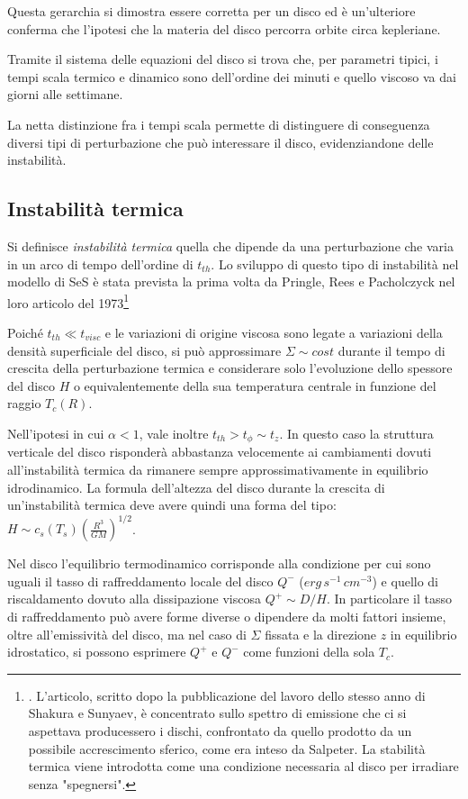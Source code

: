 \documentclass[a4paperbi]{article}
\begin{document}
	Questa gerarchia si dimostra essere corretta per un disco ed è un'ulteriore conferma che l'ipotesi che la materia del disco percorra orbite circa kepleriane.

	Tramite il sistema delle equazioni del disco si trova che, per parametri tipici, i tempi scala termico e dinamico sono dell'ordine dei minuti e quello viscoso va dai giorni alle settimane.

	La netta distinzione fra i tempi scala permette di distinguere di conseguenza diversi tipi di perturbazione che può interessare il disco, evidenziandone delle instabilità.
	
\subsection{Instabilità termica}
	
	Si definisce \textit{instabilità termica} quella che dipende da una perturbazione che varia in un arco di tempo dell'ordine di $t_{th}$. Lo sviluppo di questo tipo di instabilità nel modello di SeS è stata prevista la prima volta da Pringle, Rees e Pacholczyck nel loro articolo del 1973\footnote{\cite{PringleReesPacholczyk1973}. L'articolo, scritto dopo la pubblicazione del lavoro dello stesso anno di Shakura e Sunyaev, è concentrato sullo spettro di emissione che ci si aspettava producessero i dischi, confrontato da quello prodotto da un possibile accrescimento sferico, come era inteso da Salpeter. La stabilità termica viene introdotta come una condizione necessaria al disco per irradiare senza "spegnersi".}

	Poiché $t_{th}\ll t_{visc}$ e le variazioni di origine viscosa sono legate a variazioni della densità superficiale del disco, si può approssimare $\Sigma\sim cost$ durante il tempo di crescita della perturbazione termica e considerare solo l'evoluzione dello spessore del disco $H$ o equivalentemente della sua temperatura centrale in funzione del raggio $T_c(R)$.
	
	Nell'ipotesi in cui $\alpha<1$, vale inoltre $t_{th}>t_\phi\sim t_z$. In questo caso la struttura verticale del disco risponderà abbastanza velocemente ai cambiamenti dovuti all'instabilità termica da rimanere sempre approssimativamente in equilibrio idrodinamico. La formula dell'altezza del disco durante la crescita di un'instabilità termica deve avere quindi una forma del tipo: $H\sim c_s(T_s)\left(\frac{R^3}{GM}\right)^{1/2}$.
	
	Nel disco l'equilibrio termodinamico corrisponde alla condizione per cui sono uguali il tasso di raffreddamento locale del disco $Q^-$ ($erg\,s^{-1}\,cm^{-3}$) e quello di riscaldamento dovuto alla dissipazione viscosa $Q^+\sim D/H$. In particolare il tasso di raffreddamento può avere forme diverse o dipendere da molti fattori insieme, oltre all'emissività del disco, ma nel caso di $\Sigma$ fissata e la direzione $z$ in equilibrio idrostatico, si possono esprimere $Q^+$ e $Q^-$ come funzioni della sola $T_c$. 
	
\end{document}
